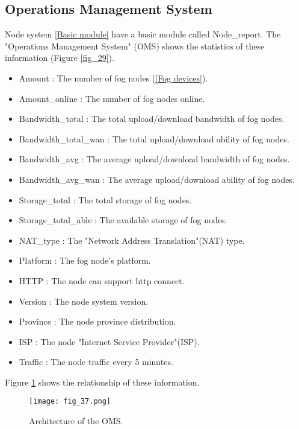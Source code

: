 \subsection{Operations Management System}
 \label{Operations Management System}
 Node system \ref{Basic module} have a basic module called Node\_report. The "Operations Management System"
(OMS) shows the statistics of these information (Figure \ref{fig_29}).
\begin{itemize}
	\item Amount                 : The number of fog nodes (\ref{Fog devices}).
	\item Amount\_online         : The number of fog nodes online.
  \item Bandwidth\_total       : The total upload/download bandwidth of fog nodes.
  \item Bandwidth\_total\_wan  : The total upload/download ability   of fog nodes.
  \item Bandwidth\_avg         : The average upload/download bandwidth of fog nodes.
  \item Bandwidth\_avg\_wan    : The average upload/download ability   of fog nodes.
  \item Storage\_total         : The total storage of fog nodes.
  \item Storage\_total\_able   : The available storage of fog nodes.
  \item NAT\_type              : The "Network Address Translation"(NAT) type.
  \item Platform               : The fog node's platform.
  \item HTTP                   : The node can support http connect.
  \item Version                : The node system version.
  \item Province               : The node province distribution.
  \item ISP                    : The node "Internet Service Provider"(ISP).
  \item Traffic                : The node traffic every 5 minutes.
\end{itemize}
  Figure \ref{fig_37} shows the relationship of these information.

\begin{figure}[htbp]
\centering
	  \texttt{[image: fig\_37.png]}
    \caption{ Architecture of the OMS.}
 \label{fig_37}
\end{figure}

